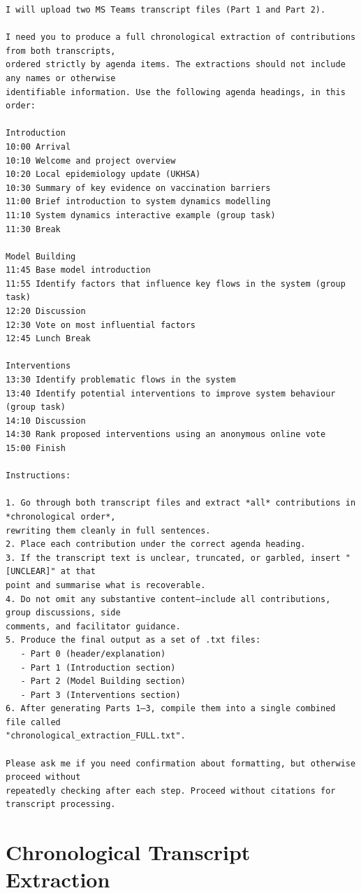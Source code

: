 \documentclass{article}
\begin{document}
\begin{verbatim}
I will upload two MS Teams transcript files (Part 1 and Part 2).

I need you to produce a full chronological extraction of contributions from both transcripts, 
ordered strictly by agenda items. The extractions should not include any names or otherwise 
identifiable information. Use the following agenda headings, in this order:

Introduction
10:00 Arrival
10:10 Welcome and project overview
10:20 Local epidemiology update (UKHSA)
10:30 Summary of key evidence on vaccination barriers
11:00 Brief introduction to system dynamics modelling
11:10 System dynamics interactive example (group task)
11:30 Break

Model Building
11:45 Base model introduction
11:55 Identify factors that influence key flows in the system (group task)
12:20 Discussion
12:30 Vote on most influential factors
12:45 Lunch Break

Interventions
13:30 Identify problematic flows in the system
13:40 Identify potential interventions to improve system behaviour (group task)
14:10 Discussion
14:30 Rank proposed interventions using an anonymous online vote
15:00 Finish

Instructions:

1. Go through both transcript files and extract *all* contributions in *chronological order*, 
rewriting them cleanly in full sentences.
2. Place each contribution under the correct agenda heading.
3. If the transcript text is unclear, truncated, or garbled, insert "[UNCLEAR]" at that 
point and summarise what is recoverable.
4. Do not omit any substantive content—include all contributions, group discussions, side 
comments, and facilitator guidance.
5. Produce the final output as a set of .txt files:
   - Part 0 (header/explanation)
   - Part 1 (Introduction section)
   - Part 2 (Model Building section)
   - Part 3 (Interventions section)
6. After generating Parts 1–3, compile them into a single combined file called 
"chronological_extraction_FULL.txt".

Please ask me if you need confirmation about formatting, but otherwise proceed without 
repeatedly checking after each step. Proceed without citations for transcript processing.
\end{verbatim}

\section{Chronological Transcript Extraction}
\end{document}
